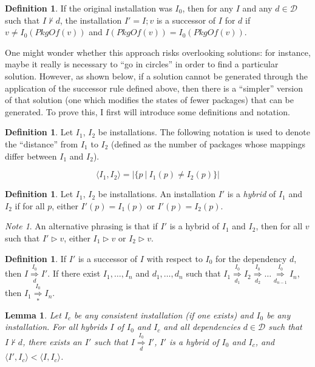 \documentclass[letterpaper]{article}
\newtheorem{lemma}[theorem]{Lemma}
\theoremstyle{definition}
\newtheorem{definition}[theorem]{Definition}
\theoremstyle{remark}
\newtheorem*{note}{Note}
\newcommand{\D}{\mathcal{D}}
\newcommand{\pkgof}[1]{PkgOf(#1)}
\newcommand{\st}{\ |\ }
\newcommand{\idist}[2]{\langle#1,#2\rangle}
\newcommand{\len}[1]{\lvert#1\rvert}
\newcommand{\nsol}[2]{\overset{#1}{\underset{#2}{\Rightarrow}}}
\newcommand{\nsolmany}[1]{\overset{#1}{\underset{*}{\Rightarrow}}}
\newcommand{\installs}{\vartriangleright}
\newcommand{\satisfies}{\vdash}
\begin{document}
\begin{definition}
  If the original installation was $I_0$, then for any $I$ and any $d
  \in \D$ such that $I \not \satisfies d$, the installation $I'=I;v$
  is a successor of $I$ for $d$ if $v \neq I_0(\pkgof{v})$ and
  $I(\pkgof{v})=I_0(\pkgof{v})$.
\end{definition}

One might wonder whether this approach risks overlooking solutions:
for instance, maybe it really is necessary to ``go in circles'' in
order to find a particular solution.  However, as shown below, if a
solution cannot be generated through the application of the successor
rule defined above, then there is a ``simpler'' version of that
solution (one which modifies the states of fewer packages) that can be
generated.  To prove this, I first will introduce some definitions and
notation.

\begin{definition}
  Let $I_1$, $I_2$ be installations.  The following notation is used
  to denote the ``distance'' from $I_1$ to $I_2$ (defined as the
  number of packages whose mappings differ between $I_1$ and $I_2$).

  \begin{equation}
    \idist{I_1}{I_2}=\len{\{p \st I_1(p) \neq I_2(p)\}}
  \end{equation}
\end{definition}

\begin{definition}
  Let $I_1$, $I_2$ be installations.  An installation $I'$ is a
  \emph{hybrid} of $I_1$ and $I_2$ if for all $p$, either
  $I'(p)=I_1(p)$ or $I'(p)=I_2(p)$.
\end{definition}

\begin{note}
  An alternative phrasing is that if $I'$ is a hybrid of $I_1$ and
  $I_2$, then for all $v$ such that $I' \installs v$, either $I_1
  \installs v$ or $I_2 \installs v$.
\end{note}

\begin{definition}
  If $I'$ is a successor of $I$ with respect to $I_0$ for the
  dependency $d$, then $I \nsol{I_0}{d} I'$.  If there exist $I_1,
  \dots, I_n$ and $d_1, \dots, d_n$ such that $I_1 \nsol{I_0}{d_1} I_2
  \nsol{I_0}{d_2} \dots \nsol{I_0}{d_{n-1}} I_n$, then $I_1
  \nsolmany{I_0} I_n$.
\end{definition}

\begin{lemma}
  Let $I_c$ be any consistent installation (if one exists) and $I_0$
  be any installation.  For all hybrids $I$ of $I_0$ and $I_c$ and all
  dependencies $d \in \D$ such that $I \not \satisfies d$, there
  exists an $I'$ such that $I \nsol{I_0}{d} I'$, $I'$ is a hybrid of
  $I_0$ and $I_c$, and $\idist{I'}{I_c} < \idist{I}{I_c}$.
\end{lemma}
\end{document}
